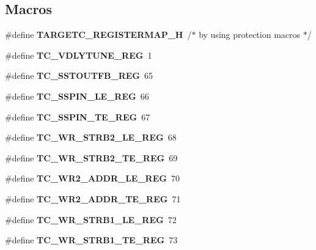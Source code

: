 \subsection*{Macros}
\begin{DoxyCompactItemize}
\item 
\mbox{\label{_t_a_r_g_e_t_c___register_map_8h_a7fd4241dfcd7f86a39e8c6f0bd5b457c}} 
\#define {\bfseries T\+A\+R\+G\+E\+T\+C\+\_\+\+R\+E\+G\+I\+S\+T\+E\+R\+M\+A\+P\+\_\+H}~/$\ast$ by using protection macros $\ast$/
\item 
\#define \textbf{ T\+C\+\_\+\+V\+D\+L\+Y\+T\+U\+N\+E\+\_\+\+R\+EG}~1
\item 
\mbox{\label{_t_a_r_g_e_t_c___register_map_8h_a321a0eb262c8474b316901d339b2836c}} 
\#define {\bfseries T\+C\+\_\+\+S\+S\+T\+O\+U\+T\+F\+B\+\_\+\+R\+EG}~65
\item 
\mbox{\label{_t_a_r_g_e_t_c___register_map_8h_a6d7aa4301c9b6fce55b14bd17a214f46}} 
\#define {\bfseries T\+C\+\_\+\+S\+S\+P\+I\+N\+\_\+\+L\+E\+\_\+\+R\+EG}~66
\item 
\mbox{\label{_t_a_r_g_e_t_c___register_map_8h_aedc6e65dc93ee7c4c2dc5f54da4707fa}} 
\#define {\bfseries T\+C\+\_\+\+S\+S\+P\+I\+N\+\_\+\+T\+E\+\_\+\+R\+EG}~67
\item 
\mbox{\label{_t_a_r_g_e_t_c___register_map_8h_a64e7b473064dda2388c62ca6f9401d9c}} 
\#define {\bfseries T\+C\+\_\+\+W\+R\+\_\+\+S\+T\+R\+B2\+\_\+\+L\+E\+\_\+\+R\+EG}~68
\item 
\mbox{\label{_t_a_r_g_e_t_c___register_map_8h_afb4e7e0a8c93b6d97873588ddc56dee0}} 
\#define {\bfseries T\+C\+\_\+\+W\+R\+\_\+\+S\+T\+R\+B2\+\_\+\+T\+E\+\_\+\+R\+EG}~69
\item 
\mbox{\label{_t_a_r_g_e_t_c___register_map_8h_a6012bc090472db2dca717951f5f5581c}} 
\#define {\bfseries T\+C\+\_\+\+W\+R2\+\_\+\+A\+D\+D\+R\+\_\+\+L\+E\+\_\+\+R\+EG}~70
\item 
\mbox{\label{_t_a_r_g_e_t_c___register_map_8h_a6dd9175b502ec0fe0801ef2b2ff38204}} 
\#define {\bfseries T\+C\+\_\+\+W\+R2\+\_\+\+A\+D\+D\+R\+\_\+\+T\+E\+\_\+\+R\+EG}~71
\item 
\mbox{\label{_t_a_r_g_e_t_c___register_map_8h_a38b53d704e6a878c589ac60e5e467829}} 
\#define {\bfseries T\+C\+\_\+\+W\+R\+\_\+\+S\+T\+R\+B1\+\_\+\+L\+E\+\_\+\+R\+EG}~72
\item 
\mbox{\label{_t_a_r_g_e_t_c___register_map_8h_a3f4ae09c51bcb6caa320c000c8aaa4e3}} 
\#define {\bfseries T\+C\+\_\+\+W\+R\+\_\+\+S\+T\+R\+B1\+\_\+\+T\+E\+\_\+\+R\+EG}~73
\item 
\mbox{\label{_t_a_r_g_e_t_c___register_map_8h_a7d7e20c2496226449d02130ca7f9fd9e}} 

\end{DoxyCompactItemize}
